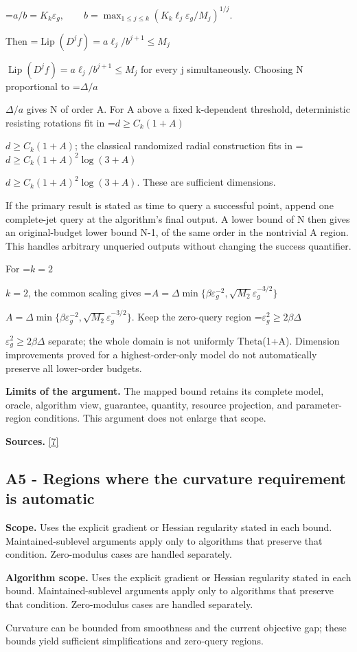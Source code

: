 \documentclass[10pt,a4paper]{article}
\newcommand{\AtlasMath}[1]{\par\begingroup\centering\setbox0=\hbox{$\displaystyle #1$}\ifdim\wd0>1.4\linewidth\typeout{ATLAS WIDE FORMULA: \the\wd0}\fi\ifdim\wd0>\linewidth\resizebox{\linewidth}{!}{\box0}\else\box0\fi\par\endgroup}
\newcommand{\AtlasInlineMath}[1]{\begingroup\setbox0=\hbox{$#1$}\ifdim\wd0>.4\linewidth\endgroup\AtlasMath{#1}\else\endgroup$#1$\fi}
\begin{document}
\AtlasMath{a/b=K_k\varepsilon_g,\qquad
b=\max_{1\le j\le k}(K_k\ell_j\varepsilon_g/M_j)^{1/j}.}

Then \AtlasInlineMath{\operatorname{Lip}(D^jf)=a\ell_j/b^{j+1}\le M_j} for every j simultaneously. Choosing N proportional to \AtlasInlineMath{\Delta/a} gives N of order A. For A above a fixed k-dependent threshold, deterministic resisting rotations fit in \AtlasInlineMath{d\ge C_k(1+A)}; the classical randomized radial construction fits in \AtlasInlineMath{d\ge C_k(1+A)^2\log(3+A)}. These are sufficient dimensions.

If the primary result is stated as time to query a successful point, append one complete-jet query at the algorithm's final output. A lower bound of N then gives an original-budget lower bound N-1, of the same order in the nontrivial A region. This handles arbitrary unqueried outputs without changing the success quantifier.

For \AtlasInlineMath{k=2}, the common scaling gives \AtlasInlineMath{A=\Delta\min\{\beta\varepsilon_g^{-2},\sqrt{M_2}\varepsilon_g^{-3/2}\}}. Keep the zero-query region \AtlasInlineMath{\varepsilon_g^2\ge2\beta\Delta} separate; the whole domain is not uniformly Theta(1+A). Dimension improvements proved for a highest-order-only model do not automatically preserve all lower-order budgets.

\textbf{Limits of the argument.} The mapped bound retains its complete model, oracle, algorithm view, guarantee, quantity, resource projection, and parameter-region conditions. This argument does not enlarge that scope.

\textbf{Sources.} \href{https://arxiv.org/abs/1710.11606v3}{[7]}

\subsection{A5 - Regions where the curvature requirement is automatic}
\textbf{Scope.} Uses the explicit gradient or Hessian regularity stated in each bound. Maintained-sublevel arguments apply only to algorithms that preserve that condition. Zero-modulus cases are handled separately.

\textbf{Algorithm scope.} Uses the explicit gradient or Hessian regularity stated in each bound. Maintained-sublevel arguments apply only to algorithms that preserve that condition. Zero-modulus cases are handled separately.

Curvature can be bounded from smoothness and the current objective gap; these bounds yield sufficient simplifications and zero-query regions.
\end{document}
